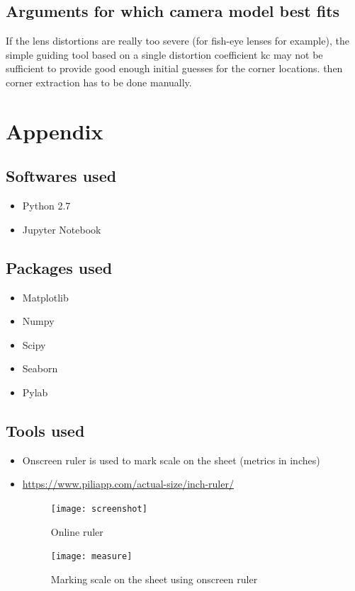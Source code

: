 \documentclass[11pt,a4paper]{article}
\begin{document}
\subsection{Arguments for which camera model best fits} 
	If the lens distortions are really too severe (for fish-eye lenses for example), the simple guiding tool based on a single distortion coefficient kc may not be sufficient to provide good enough initial guesses for the corner locations. then corner extraction has to be done manually.

\newpage
\section{Appendix}
\subsection{Softwares used}
\begin{itemize}
\item Python 2.7
\item Jupyter Notebook
\end{itemize}

\subsection{Packages used}
\begin{itemize}
\item Matplotlib
\item Numpy
\item Scipy
\item Seaborn
\item Pylab
\end{itemize}

\subsection{Tools used}
\begin{itemize}
\item Onscreen ruler is used to mark scale on the sheet (metrics in inches)
\item \url{https://www.piliapp.com/actual-size/inch-ruler/}
\begin{figure}[H]
\centering	
\texttt{[image: screenshot]}
\label{fig:sub1}
\caption{Online ruler}
\end{figure}

\begin{figure}[H]
\centering	
\texttt{[image: measure]}
\label{fig:sub1}
\caption{Marking scale on the sheet using onscreen ruler}
\end{figure}

\end{itemize}
\end{document}
